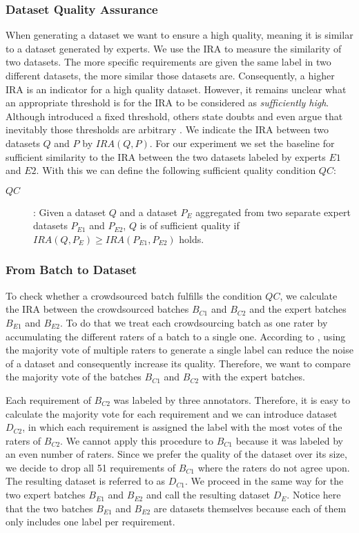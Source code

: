 \subsubsection{Dataset Quality Assurance}
When generating a dataset we want to ensure a high quality, meaning it is similar to a dataset generated by experts.
We use the \ac{IRA} to measure the similarity of two datasets.
The more specific requirements are given the same label in two different datasets, the more similar those datasets are.
Consequently, a higher \ac{IRA} is an indicator for a high quality dataset.
However, it remains unclear what an appropriate threshold is for the \ac{IRA} to be considered as \textit{sufficiently high}.
Although \textcite{Landis:1977} introduced a fixed threshold, others state doubts and even argue that inevitably those thresholds are arbitrary \parencites{Dunn:1989}{Brennan:1992}.
We indicate the \ac{IRA} between two datasets $Q$ and $P$ by $IRA(Q, P)$.
For our experiment we set the baseline for sufficient similarity to the \ac{IRA} between the two datasets labeled by experts $E1$ and $E2$.
With this we can define the following sufficient quality condition $QC$:
\begin{description}
    \item[$QC$]: Given a dataset $Q$ and a dataset $P_E$ aggregated from two separate expert datasets $P_{E1}$ and $P_{E2}$, $Q$ is of sufficient quality if $IRA(Q, P_E) \ge IRA(P_{E1}, P_{E2})$ holds.
\end{description}

\subsubsection{From Batch to Dataset}
To check whether a crowdsourced batch fulfills the condition $QC$, we calculate the \ac{IRA} between the crowdsourced batches $B_{C1}$ and $B_{C2}$ and the expert batches $B_{E1}$ and $B_{E2}$.
To do that we treat each crowdsourcing batch as one rater by accumulating the different raters of a batch to a single one.
According to \textcite{Nowak:2010}, using the majority vote of multiple raters to generate a single label can reduce the noise of a dataset and consequently increase its quality.
Therefore, we want to compare the majority vote of the batches $B_{C1}$ and $B_{C2}$ with the expert batches.

Each requirement of $B_{C2}$ was labeled by three annotators.
Therefore, it is easy to calculate the majority vote for each requirement and we can introduce dataset $D_{C2}$, in which each requirement is assigned the label with the most votes of the raters of $B_{C2}$.
We cannot apply this procedure to $B_{C1}$ because it was labeled by an even number of raters.
Since we prefer the quality of the dataset over its size, we decide to drop all 51 requirements of $B_{C1}$ where the raters do not agree upon.
The resulting dataset is referred to as $D_{C1}$.
We proceed in the same way for the two expert batches $B_{E1}$ and $B_{E2}$ and call the resulting dataset $D_{E}$.
Notice here that the two batches $B_{E1}$ and $B_{E2}$ are datasets themselves because each of them only includes one label per requirement.

